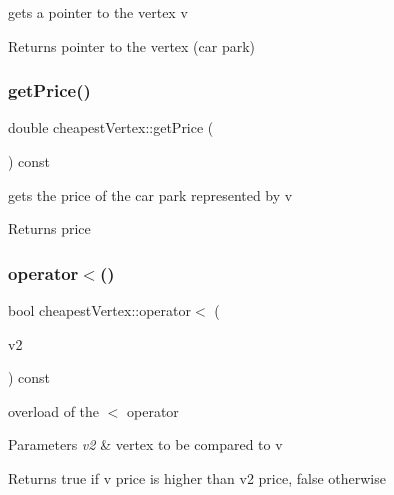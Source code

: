 gets a pointer to the vertex v 

\begin{DoxyReturn}{Returns}
pointer to the vertex (car park) 
\end{DoxyReturn}
\hypertarget{classcheapest_vertex_a770ec67eadb07e548e15b396440bbc3a}{}\label{classcheapest_vertex_a770ec67eadb07e548e15b396440bbc3a} 
\subsubsection{\texorpdfstring{get\+Price()}{getPrice()}}
{\footnotesize\ttfamily double cheapest\+Vertex\+::get\+Price (\begin{DoxyParamCaption}{ }\end{DoxyParamCaption}) const}



gets the price of the car park represented by v 

\begin{DoxyReturn}{Returns}
price 
\end{DoxyReturn}
\hypertarget{classcheapest_vertex_af3cad9d9f57eae9dee7119465185e5af}{}\label{classcheapest_vertex_af3cad9d9f57eae9dee7119465185e5af} 
\subsubsection{\texorpdfstring{operator$<$()}{operator<()}}
{\footnotesize\ttfamily bool cheapest\+Vertex\+::operator$<$ (\begin{DoxyParamCaption}\item[{const \hyperlink{classcheapest_vertex}{cheapest\+Vertex} \&}]{v2 }\end{DoxyParamCaption}) const}



overload of the $<$ operator 


\begin{DoxyParams}{Parameters}
{\em v2} & vertex to be compared to v\\
\hline
\end{DoxyParams}
\begin{DoxyReturn}{Returns}
true if v price is higher than v2 price, false otherwise 
\end{DoxyReturn}
\hypertarget{classcheapest_vertex_a28cc5cafd2972d7b4095e0d251688128}{}\label{classcheapest_vertex_a28cc5cafd2972d7b4095e0d251688128} 
